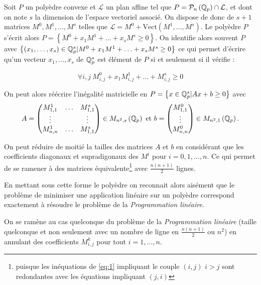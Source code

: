 Soit $P$ un polyèdre convexe et $\mathcal{L} $ un plan affine tel que $P = \mathcal{P}_n \left( \mathbb{Q}_p \right) \cap \mathcal{L}$, et dont on note $s$ la dimension de l'espace vectoriel associé. On dispose de donc de $s +1 $ matrices $M^0,M^1,\ldots, M^s$ telles que $\mathcal{L} = M^0 + \text{Vect}\left( M^1,\ldots,M^s \right)$. Le polyèdre $P$ s'écrit alors $P = \left\{ M^0 + x_1 M^1 + \ldots + x_s M^s \ge 0 \right\}$. On identifie alors souvent $P$ avec $\left\{ \left( x_1,\ldots,x_s \right) \in \mathbb{Q}_p^s |M^0 + x_1 M^1 + \ldots + x_s M^s \ge 0 \right\}$ ce qui permet d'écrire qu'un vecteur $x_1,\ldots,x_s$ de $\mathbb{Q}_p^s$ est élément de $P$ si et seulement si il vérifie :
 
	\begin{equation}
	\label{eq:1} 
\forall i,j ~  M^0_{i,j} + x_1 M^1_{i,j} + \ldots + M^s_{i,j} \ge 0
	\end{equation}

On peut alors réécrire l'inégalité matricielle en  $P = \left\{ x \in \mathbb{Q}_p^s \-| Ax + b \ge 0 \right\} $ avec 
\[A = \begin{pmatrix} M^1_{1,1} & \ldots & M^s_{1,1} \\
\vdots & & \vdots \\
M^1_{n,n} & \ldots & M^s_{1,1}\\ \end{pmatrix} \in M_{n^2,s}\left( \mathbb{Q}_p \right) \text{ et } 
b = \begin{pmatrix} M^0_{1,1} \\
\vdots\\
M^0_{n,n} \end{pmatrix} \in M_{n^2, 1}\left( \mathbb{Q}_p \right) 
.\]  
\begin{remarque}
	On peut réduire de moitié la tailles des matrices $A$ et $b$ en considérant que les coefficients diagonaux et supradigonaux des $M^i$ pour $i = 0,1,\ldots,n$. Ce qui permet de se ramener à des matrices équivalente\footnote{puisque les inéquations de \ref{eq:1} impliquant le couple $(i,j)$ $i>j$ sont redondantes avec les équations impliquant $(j,i)$}  avec $\frac{n(n+1)}{2}$ lignes.  
\end{remarque}

En mettant sous cette forme le polyèdre on reconnait alors aisément que le problème de minimiser une application linéaire sur un polyèdre correspond exactement à résoudre le problème de la \textit{Programmation linéaire}.

\begin{remarque}
	On se ramène au cas quelconque du problème de la \textit{Programmation linéaire} (taille quelconque et non seulement avec un nombre de ligne en $\frac{n(n+1)}{2}$ ou $n^2$) en annulant des coefficients $M^k_{i,j}$ pour tout $i=1,\ldots,n$.   
\end{remarque}

